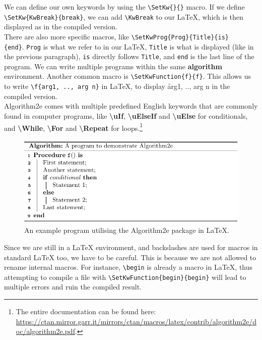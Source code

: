 We can define our own keywords by using the \texttt{\textbackslash SetKw\{\}\{\}} macro. If we define \texttt{\textbackslash SetKw\{KwBreak\}\{break\}}, we can add \texttt{\textbackslash KwBreak} to our LaTeX, which is then displayed as \KwBreak in the compiled version. \\

There are also more specific macros, like \texttt{\textbackslash SetKwProg\{Prog\}\{Title\}\{is\}\\\{end\}}. \texttt{Prog} is what we refer to in our LaTeX, \texttt{Title} is what is displayed (like \KwBreak in the previous paragraph), \texttt{is} directly follows \texttt{Title}, and \texttt{end} is the last line of the program. We can write multiple programs within the same \textbf{algorithm} environment. Another common macro is \texttt{\textbackslash SetKwFunction\{f\}\{f\}}. This allows us to write \texttt{\textbackslash f\{arg1, .., arg n\}} in LaTeX, to display \f{arg1, .., arg n} in the compiled version. \\

Algorithm2e comes with multiple predefined English keywords that are commonly found in computer programs, like \textbf{\textbackslash uIf}, \textbf{\textbackslash uElseIf} and \textbf{\textbackslash uElse} for conditionals, and \textbf{\textbackslash While}, \textbf{\textbackslash For} and \textbf{\textbackslash Repeat} for loops.\footnote{The entire documentation can be found here: \url{https://ctan.mirror.garr.it/mirrors/ctan/macros/latex/contrib/algorithm2e/doc/algorithm2e.pdf}.} \\

\begin{figure}[ht]
    \centering
    \includegraphics[scale=.95]{assets/chapter2/TheFirstAlgorithm2e.pdf}
    \caption{An example program utilising the Algorithm2e package in LaTeX.}
    \label{The first Algorithm2e program.}
\end{figure}

Since we are still in a LaTeX environment, and backslashes are used for macros in standard LaTeX too, we have to be careful. This is because we are not allowed to rename internal macros. For instance, \texttt{\textbackslash begin} is already a macro in LaTeX, thus attempting to compile a file with \texttt{\textbackslash SetKwFunction\{begin\}\{begin\}} will lead to multiple errors and ruin the compiled result. \\

